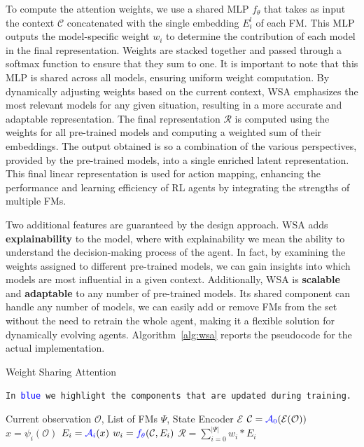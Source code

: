 To compute the attention weights, we use a shared MLP $f_\theta$ that takes as input the context $\mathcal{C}$ concatenated with the single embedding $E^{l}_i$ of each FM\@.
This MLP outputs the model-specific weight $w_i$ to determine the contribution of each model in the final representation.
Weights are stacked together and passed through a softmax function to ensure that they sum to one.
It is important to note that this MLP is shared across all models, ensuring uniform weight computation.
By dynamically adjusting weights based on the current context, WSA emphasizes the most relevant models for any given situation, resulting in a more accurate and adaptable representation.
The final representation $\mathcal{R}$ is computed using the weights for all pre-trained models and computing a weighted sum of their embeddings.
The output obtained is so a combination of the various perspectives, provided by the pre-trained models, into a single enriched latent representation.
This final linear representation is used for action mapping, enhancing the performance and learning efficiency of RL agents by integrating the strengths of multiple FMs.


Two additional features are guaranteed by the design approach.
WSA adds \textbf{explainability} to the model, where with explainability we mean the ability to understand the decision-making process of the agent.
In fact, by examining the weights assigned to different pre-trained models, we can gain insights into which models are most influential in a given context.
Additionally, WSA is \textbf{scalable} and \textbf{adaptable} to any number of pre-trained models.
Its shared component can handle any number of models, we can easily add or remove FMs from the set without the need to retrain the whole agent, making it a flexible solution for dynamically evolving agents.
Algorithm~\ref{alg:wsa} reports the pseudocode for the actual implementation.

\begin{algorithm}[ht]
    \caption{Weight Sharing Attention}\label{alg:wsa}
    \texttt{In \textcolor{blue}{blue} we highlight the components that are updated during training.}\\
    \begin{algorithmic}[1]
        \Require Current observation $\mathcal{O}$, List of FMs $\Psi$, State Encoder $\mathcal{E}$
        \State $\mathcal{C} = \textcolor{blue}{\mathcal{A}_0}(\mathcal{E}(\mathcal{O}))$ 
            \State $x = \psi_i(\mathcal{O})$ 
            \State $E_i = \textcolor{blue}{\mathcal{A}_i}(x)$ 
            \State $w_i = \textcolor{blue}{f_\theta}(\mathcal{C}, E_i)$ 
        \EndFor
        \State $\mathcal{R} = \sum_{i=0}^{|\Psi|} w_i * E_i$ 
    \end{algorithmic}
\end{algorithm}





